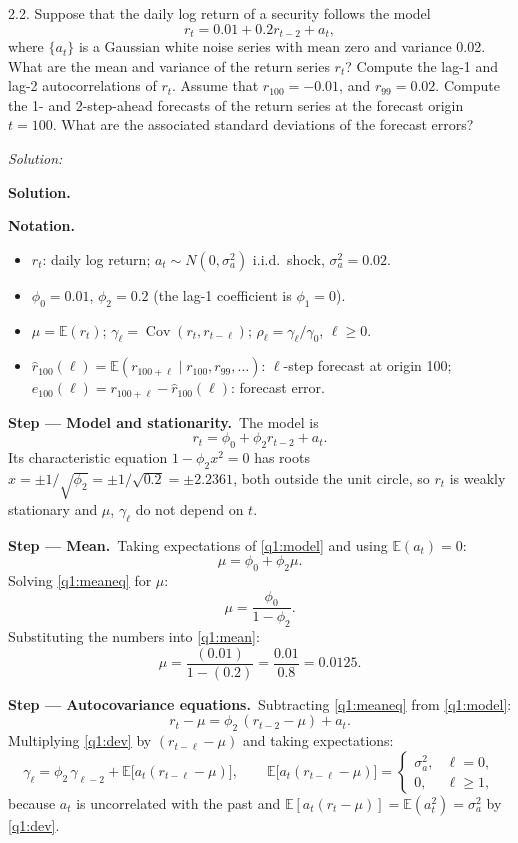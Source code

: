 \documentclass[11pt,a4paper]{article}
\newif\ifsolucoes
\newcommand{\espacoresol}{4.5cm}   %
\numberwithin{equation}{questao}   %
\newenvironment{notacao}{\par\smallskip\noindent\textbf{Notation.}\begin{itemize}[leftmargin=1.4em,topsep=1pt,itemsep=0pt]\small}{\end{itemize}}
\newcommand{\resolespaco}{\ifsolucoes\else\par\textit{Solution:}\vspace{\espacoresol}\par\fi}
\newcommand{\passo}[2]{\par\smallskip\noindent\textbf{Step --- #1.}~#2}
\newcommand{\solhead}{\par\medskip\noindent{\color{blue!55!black}\rule{\linewidth}{0.3pt}}\par\noindent\textbf{Solution.}}
\newcommand{\E}{\mathbb{E}}
\newcommand{\Cov}{\operatorname{Cov}}
\begin{document}
2.2. Suppose that the daily log return of a security follows the model
\[ r_t = 0.01 + 0.2 r_{t-2} + a_t , \]
where $\{a_t\}$ is a Gaussian white noise series with mean zero and variance 0.02. What are the mean
and variance of the return series $r_t$? Compute the lag-1 and lag-2 autocorrelations of $r_t$.
Assume that $r_{100} = -0.01$, and $r_{99} = 0.02$. Compute the 1- and 2-step-ahead forecasts of the
return series at the forecast origin $t = 100$. What are the associated standard deviations of the
forecast errors?
\resolespaco
\begin{sol}
\solhead
\begin{notacao}
\item $r_t$: daily log return; $a_t\sim N(0,\sigma_a^2)$ i.i.d.\ shock, $\sigma_a^2=0.02$.
\item $\phi_0=0.01$, $\phi_2=0.2$ (the lag-1 coefficient is $\phi_1=0$).
\item $\mu=\E(r_t)$; $\gamma_\ell=\Cov(r_t,r_{t-\ell})$; $\rho_\ell=\gamma_\ell/\gamma_0$, $\ell\ge 0$.
\item $\hat r_{100}(\ell)=\E(r_{100+\ell}\mid r_{100},r_{99},\dots)$: $\ell$-step forecast at origin 100;
  $e_{100}(\ell)=r_{100+\ell}-\hat r_{100}(\ell)$: forecast error.
\end{notacao}

\passo{Model and stationarity}{The model is}
\begin{equation}\label{q1:model}
r_t=\phi_0+\phi_2 r_{t-2}+a_t .
\end{equation}
Its characteristic equation $1-\phi_2x^2=0$ has roots $x=\pm 1/\sqrt{\phi_2}=\pm 1/\sqrt{0.2}=\pm 2.2361$,
both outside the unit circle, so $r_t$ is weakly stationary and $\mu$, $\gamma_\ell$ do not depend on $t$.

\passo{Mean}{Taking expectations of \eqref{q1:model} and using $\E(a_t)=0$:}
\begin{equation}\label{q1:meaneq}
\mu=\phi_0+\phi_2\mu .
\end{equation}
Solving \eqref{q1:meaneq} for $\mu$:
\begin{equation}\label{q1:mean}
\mu=\frac{\phi_0}{1-\phi_2}.
\end{equation}
Substituting the numbers into \eqref{q1:mean}:
\[
\mu=\frac{(0.01)}{1-(0.2)}=\frac{0.01}{0.8}=0.0125 .
\]

\passo{Autocovariance equations}{Subtracting \eqref{q1:meaneq} from \eqref{q1:model}:}
\begin{equation}\label{q1:dev}
r_t-\mu=\phi_2\,(r_{t-2}-\mu)+a_t .
\end{equation}
Multiplying \eqref{q1:dev} by $(r_{t-\ell}-\mu)$ and taking expectations:
\begin{equation}\label{q1:yw}
\gamma_\ell=\phi_2\,\gamma_{\ell-2}+\E\big[a_t(r_{t-\ell}-\mu)\big],
\qquad
\E\big[a_t(r_{t-\ell}-\mu)\big]=\begin{cases}\sigma_a^2,&\ell=0,\\ 0,&\ell\ge1,\end{cases}
\end{equation}
because $a_t$ is uncorrelated with the past and $\E[a_t(r_t-\mu)]=\E(a_t^2)=\sigma_a^2$ by \eqref{q1:dev}.


\end{sol}
\end{document}
